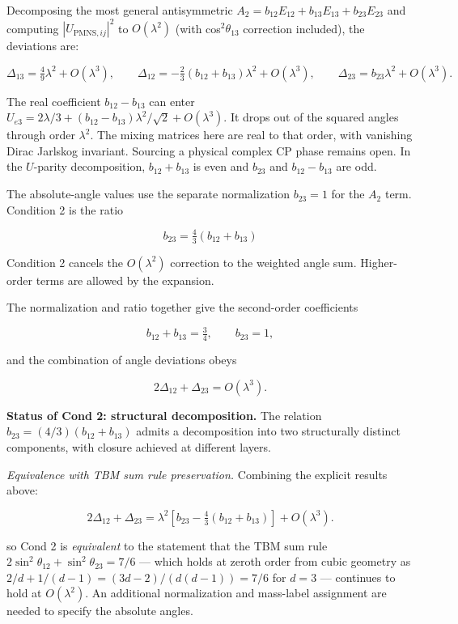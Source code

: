 \documentclass[
]{article}
\begin{document}
Decomposing the most general antisymmetric
\(A_2 = b_{12} E_{12} + b_{13} E_{13} + b_{23} E_{23}\) and computing
\(|U_{\text{PMNS},ij}|^2\) to \(O(\lambda^2)\) (with
cos\(^2\theta_{13}\) correction included), the deviations are:

\[\Delta_{13} = \tfrac{4}{9}\lambda^2 + O(\lambda^3),\qquad \Delta_{12} = -\tfrac{2}{3}(b_{12}+b_{13})\lambda^2 + O(\lambda^3),\qquad \Delta_{23} = b_{23}\lambda^2 + O(\lambda^3).\]

The real coefficient \(b_{12}-b_{13}\) can enter
\(U_{e3}=2\lambda/3+(b_{12}-b_{13})\lambda^2/\sqrt2+O(\lambda^3)\). It
drops out of the squared angles through order \(\lambda^2\). The mixing
matrices here are real to that order, with vanishing Dirac Jarlskog
invariant. Sourcing a physical complex CP phase remains open. In the
\(U\)-parity decomposition, \(b_{12}+b_{13}\) is even and \(b_{23}\) and
\(b_{12}-b_{13}\) are odd.

The absolute-angle values use the separate normalization \(b_{23}=1\)
for the \(A_2\) term. Condition 2 is the ratio

\[b_{23} = \tfrac{4}{3}(b_{12}+b_{13})\]

Condition 2 cancels the \(O(\lambda^2)\) correction to the weighted
angle sum. Higher-order terms are allowed by the expansion.

The normalization and ratio together give the second-order coefficients

\[b_{12} + b_{13} = \tfrac{3}{4}, \qquad b_{23} = 1,\]

and the combination of angle deviations obeys

\[2\Delta_{12}+\Delta_{23}=O(\lambda^3).\]

\textbf{Status of Cond 2: structural decomposition.} The relation
\(b_{23} = (4/3)(b_{12}+b_{13})\) admits a decomposition into two
structurally distinct components, with closure achieved at different
layers.

\emph{Equivalence with TBM sum rule preservation.} Combining the
explicit results above:

\[2\Delta_{12} + \Delta_{23} = \lambda^2\left[b_{23} - \tfrac{4}{3}(b_{12}+b_{13})\right]+O(\lambda^3).\]

so Cond 2 is \emph{equivalent} to the statement that the TBM sum rule
\(2\sin^2\theta_{12} + \sin^2\theta_{23} = 7/6\) --- which holds at
zeroth order from cubic geometry as
\(2/d + 1/(d-1) = (3d-2)/(d(d-1)) = 7/6\) for \(d=3\) --- continues to
hold at \(O(\lambda^2)\). An additional normalization and mass-label
assignment are needed to specify the absolute angles.
\end{document}
